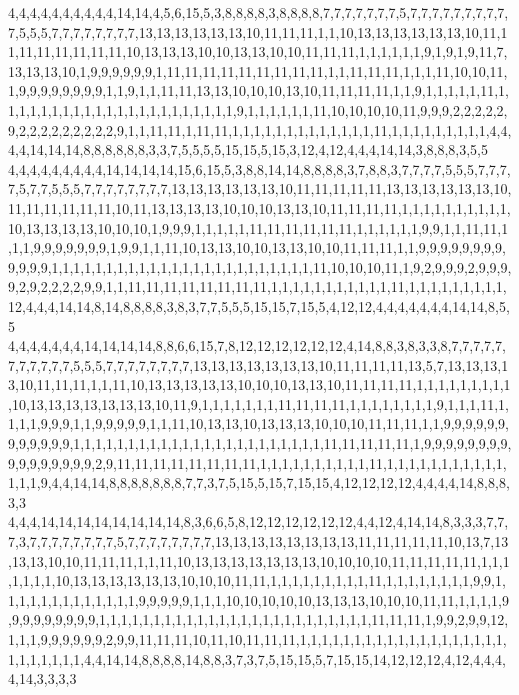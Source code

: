 4,4,4,4,4,4,4,4,4,4,14,14,4,5,6,15,5,3,8,8,8,8,3,8,8,8,8,7,7,7,7,7,7,7,5,7,7,7,7,7,7,7,7,7,7,5,5,5,7,7,7,7,7,7,7,7,13,13,13,13,13,13,10,11,11,11,1,1,10,13,13,13,13,13,13,10,11,11,11,11,11,11,11,11,10,13,13,13,10,10,13,13,10,10,11,11,11,1,1,1,1,1,1,9,1,9,1,9,11,7,13,13,13,10,1,9,9,9,9,9,9,1,11,11,11,11,11,11,11,11,11,1,1,11,11,11,1,1,1,11,10,10,11,1,9,9,9,9,9,9,9,9,1,1,9,1,1,11,11,13,13,10,10,10,13,10,11,11,11,11,1,1,9,1,1,1,1,1,11,1,1,1,1,1,1,1,1,1,1,1,1,1,1,1,1,1,1,1,1,1,1,9,1,1,1,1,1,1,11,10,10,10,10,11,9,9,9,2,2,2,2,2,9,2,2,2,2,2,2,2,2,2,9,1,1,11,11,1,11,11,1,1,1,1,1,1,1,1,1,1,1,1,1,11,1,1,1,1,1,1,1,1,1,4,4,4,4,14,14,14,8,8,8,8,8,8,3,3,7,5,5,5,5,15,15,5,15,3,12,4,12,4,4,4,14,14,3,8,8,8,3,5,5
4,4,4,4,4,4,4,4,4,14,14,14,14,15,6,15,5,3,8,8,14,14,8,8,8,8,3,7,8,8,3,7,7,7,7,5,5,5,7,7,7,7,5,7,7,5,5,5,7,7,7,7,7,7,7,7,13,13,13,13,13,13,10,11,11,11,11,11,13,13,13,13,13,13,10,11,11,11,11,11,11,10,11,13,13,13,13,10,10,10,13,13,10,11,11,11,11,1,1,1,1,1,1,1,1,1,1,10,13,13,13,13,10,10,10,1,9,9,9,1,1,1,1,1,11,11,11,11,11,11,1,1,1,1,1,1,9,9,1,1,11,11,1,1,1,9,9,9,9,9,9,9,1,9,9,1,1,11,10,13,13,10,10,13,13,10,10,11,11,11,1,1,9,9,9,9,9,9,9,9,9,9,9,9,1,1,1,1,1,1,1,1,1,1,1,1,1,1,1,1,1,1,1,1,1,1,1,1,11,10,10,10,11,1,9,2,9,9,9,2,9,9,9,9,2,9,2,2,2,2,9,9,1,1,11,11,11,11,11,11,11,11,1,1,1,1,1,1,1,1,1,1,1,11,1,1,1,1,1,1,1,1,1,12,4,4,4,14,14,8,14,8,8,8,8,3,8,3,7,7,5,5,5,15,15,7,15,5,4,12,12,4,4,4,4,4,4,4,14,14,8,5,5
4,4,4,4,4,4,4,14,14,14,14,8,8,6,6,15,7,8,12,12,12,12,12,12,4,14,8,8,3,8,3,3,8,7,7,7,7,7,7,7,7,7,7,7,5,5,5,7,7,7,7,7,7,7,7,13,13,13,13,13,13,13,10,11,11,11,11,13,5,7,13,13,13,13,10,11,11,11,1,1,11,10,13,13,13,13,13,10,10,10,13,13,10,11,11,11,11,1,1,1,1,1,1,1,1,1,10,13,13,13,13,13,13,13,10,11,9,1,1,1,1,1,1,1,11,11,11,11,1,1,1,1,1,1,1,1,9,1,1,1,11,1,1,1,1,9,9,9,1,1,9,9,9,9,9,1,1,11,10,13,13,10,13,13,13,10,10,10,11,11,11,1,1,9,9,9,9,9,9,9,9,9,9,9,9,1,1,1,1,1,1,1,1,1,1,1,1,1,1,1,1,1,1,1,1,1,1,1,11,11,11,11,11,1,9,9,9,9,9,9,9,9,9,9,9,9,9,9,9,9,2,9,11,11,11,11,11,11,11,11,1,1,1,1,1,1,1,1,1,1,11,1,1,1,1,1,1,1,1,1,1,1,1,1,1,9,4,4,14,14,8,8,8,8,8,8,8,7,7,3,7,5,15,5,15,7,15,15,4,12,12,12,12,4,4,4,4,14,8,8,8,3,3
4,4,4,14,14,14,14,14,14,14,14,8,3,6,6,5,8,12,12,12,12,12,12,4,4,12,4,14,14,8,3,3,3,7,7,7,3,7,7,7,7,7,7,7,7,5,7,7,7,7,7,7,7,7,13,13,13,13,13,13,13,13,11,11,11,11,11,10,13,7,13,13,13,10,10,11,11,11,1,1,11,10,13,13,13,13,13,13,13,10,10,10,10,11,11,11,11,11,1,1,1,1,1,1,1,10,13,13,13,13,13,13,10,10,10,11,11,1,1,1,1,1,1,1,1,1,11,1,1,1,1,1,1,1,1,9,9,1,1,1,1,1,1,1,1,1,1,1,1,1,9,9,9,9,9,1,1,1,10,10,10,10,10,13,13,13,10,10,10,11,11,1,1,1,1,9,9,9,9,9,9,9,9,9,1,1,1,1,1,1,1,1,1,1,1,1,1,1,1,1,1,1,1,1,1,1,1,1,1,11,11,11,1,9,9,2,9,9,12,1,1,1,9,9,9,9,9,9,2,9,9,11,11,11,10,11,10,11,11,11,1,1,1,1,1,1,1,1,1,1,1,1,1,1,1,1,1,1,1,1,1,1,1,1,1,1,4,4,14,14,8,8,8,8,14,8,8,3,7,3,7,5,15,15,5,7,15,15,14,12,12,12,4,12,4,4,4,4,14,3,3,3,3
